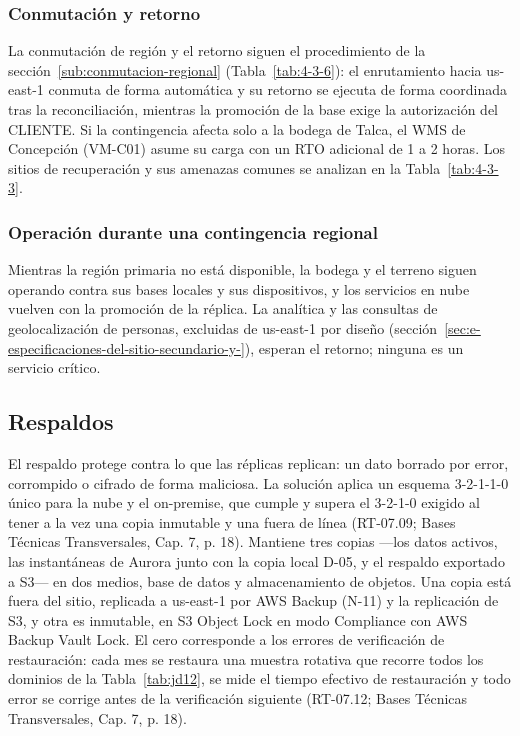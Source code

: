 \subsubsection{Conmutación y retorno}

La conmutación de región y el retorno siguen el procedimiento de la sección~\ref{sub:conmutacion-regional} (Tabla~\ref{tab:4-3-6}): el enrutamiento hacia us-east-1 conmuta de forma automática y su retorno se ejecuta de forma coordinada tras la reconciliación, mientras la promoción de la base exige la autorización del CLIENTE. Si la contingencia afecta solo a la bodega de Talca, el WMS de Concepción (VM-C01) asume su carga con un RTO adicional de 1 a 2 horas. Los sitios de recuperación y sus amenazas comunes se analizan en la Tabla~\ref{tab:4-3-3}.

\subsubsection{Operación durante una contingencia regional}

Mientras la región primaria no está disponible, la bodega y el terreno siguen operando contra sus bases locales y sus dispositivos, y los servicios en nube vuelven con la promoción de la réplica. La analítica y las consultas de geolocalización de personas, excluidas de us-east-1 por diseño (sección~\ref{sec:e-especificaciones-del-sitio-secundario-y-}), esperan el retorno; ninguna es un servicio crítico.

\subsection{Respaldos}
\label{sub:5-respaldos-esquema-3-2-1-1-0-rnf-20-07}

El respaldo protege contra lo que las réplicas replican: un dato borrado por error, corrompido o cifrado de forma maliciosa. La solución aplica un esquema 3-2-1-1-0 único para la nube y el on-premise, que cumple y supera el 3-2-1-0 exigido al tener a la vez una copia inmutable y una fuera de línea (RT-07.09; Bases Técnicas Transversales, Cap. 7, p. 18). Mantiene tres copias ---los datos activos, las instantáneas de Aurora junto con la copia local D-05, y el respaldo exportado a S3--- en dos medios, base de datos y almacenamiento de objetos. Una copia está fuera del sitio, replicada a us-east-1 por AWS Backup (N-11) y la replicación de S3, y otra es inmutable, en S3 Object Lock en modo Compliance con AWS Backup Vault Lock. El cero corresponde a los errores de verificación de restauración: cada mes se restaura una muestra rotativa que recorre todos los dominios de la Tabla~\ref{tab:jd12}, se mide el tiempo efectivo de restauración y todo error se corrige antes de la verificación siguiente (RT-07.12; Bases Técnicas Transversales, Cap. 7, p. 18).

